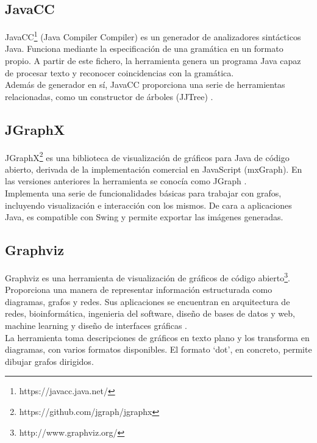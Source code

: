\subsection{JavaCC}
JavaCC\footnote{https://javacc.java.net/} (Java Compiler Compiler) es un generador de analizadores sintácticos Java.
Funciona mediante la especificación de una gramática en un formato propio.
A partir de este fichero, la herramienta genera un programa Java capaz de procesar texto y reconocer coincidencias con la gramática.
\\
Además de generador en sí, JavaCC proporciona una serie de herramientas relacionadas, como un constructor de árboles (JJTree) \cite{website:javacc}.

\subsection{JGraphX}
JGraphX\footnote{https://github.com/jgraph/jgraphx} es una biblioteca de visualización de gráficos para Java de código abierto, derivada de la implementación comercial en JavaScript (mxGraph).
En las versiones anteriores la herramienta se conocía como JGraph \cite{website:jgraphx}.
\\
Implementa una serie de funcionalidades básicas para trabajar con grafos, incluyendo visualización e interacción con los mismos.
De cara a aplicaciones Java, es compatible con Swing y permite exportar las imágenes generadas.

\subsection{Graphviz}
Graphviz es una herramienta de visualización de gráficos de código abierto\footnote{http://www.graphviz.org/}.
Proporciona una manera de representar información estructurada como diagramas, grafos y redes.
Sus aplicaciones se encuentran en arquitectura de redes, bioinformática, ingenieria del software, diseño de bases de datos y web, machine learning y diseño de interfaces gráficas \cite{website:graphviz}.
\\
La herramienta toma descripciones de gráficos en texto plano y los transforma en diagramas, con varios formatos disponibles.
El formato `dot', en concreto, permite dibujar grafos dirigidos.

